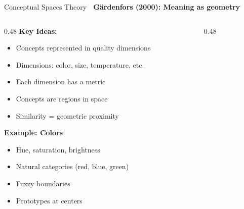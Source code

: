 \documentclass[aspectratio=169]{beamer}
\begin{document}
\begin{frame}[shrink=10]{Conceptual Spaces Theory 🌌}
\textbf{Gärdenfors (2000): Meaning as geometry}

\vspace{1em}

\begin{columns}[T]
\begin{column}{0.48\textwidth}
\textbf{Key Ideas:}
\begin{itemize}\setlength{\itemsep}{0pt}
    \item Concepts represented in quality dimensions
    \item Dimensions: color, size, temperature, etc.
    \item Each dimension has a metric
    \item Concepts are regions in space
    \item Similarity = geometric proximity
\end{itemize}

\vspace{0.5em}
\textbf{Example: Colors}
\begin{itemize}\setlength{\itemsep}{0pt}
    \item Hue, saturation, brightness
    \item Natural categories (red, blue, green)
    \item Fuzzy boundaries
    \item Prototypes at centers
\end{itemize}
\end{column}

\begin{column}{0.48\textwidth}
\begin{center}
\end{center}
\end{column}
\end{columns}
\end{frame}
\end{document}
